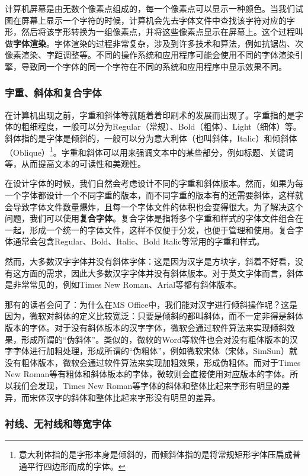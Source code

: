 计算机屏幕是由无数个像素点组成的，每一个像素点可以显示一种颜色。当我们试图在屏幕上显示一个字符的时候，计算机会先去字体文件中查找该字符对应的字形，然后将该字形转换为一组像素点，并将这些像素点显示在屏幕上。这个过程叫做\textbf{字体渲染}。字体渲染的过程非常复杂，涉及到许多技术和算法，例如抗锯齿、次像素渲染、字距调整等。不同的操作系统和应用程序可能会使用不同的字体渲染引擎，导致同一个字体的同一个字符在不同的系统和应用程序中显示效果不同。

\subsubsection{字重、斜体和复合字体}

在计算机出现之前，字重和斜体等就随着着印刷术的发展而出现了。字重指的是字体的粗细程度，一般可以分为Regular（常规）、Bold（粗体）、Light（细体）等。斜体指的是字体是倾斜的，一般可以分为意大利体（也叫斜体，Italic）和倾斜体（Oblique）\footnote{意大利体指的是字形本身是倾斜的，而倾斜体指的是将常规矩形字体压扁成普通平行四边形而成的字体。}。字重和斜体可以用来强调文本中的某些部分，例如标题、关键词等，从而提高文本的可读性和美观性。

在设计字体的时候，我们自然会考虑设计不同的字重和斜体版本。然而，如果为每一个字体都设计一个不同字重的版本，而不同字重的版本有的还需要斜体，这样就会导致字体文件数量爆炸，且每一个字体文件的体积也会变得很大。为了解决这个问题，我们可以使用\textbf{复合字体}。复合字体是指将多个字重和样式的字体文件组合在一起，形成一个统一的字体文件，这样不仅便于分发，也便于管理和使用。复合字体通常会包含Regular、Bold、Italic、Bold Italic等常用的字重和样式。

然而，大多数汉字字体并没有斜体字体：这是因为汉字是方块字，斜着不好看，没有这方面的需求，因此大多数汉字字体并没有斜体版本。对于英文字体而言，斜体是非常常见的，例如Times New Roman、Arial等都有斜体版本。

那有的读者会问了：为什么在MS Office中，我们能对汉字进行倾斜操作呢？这是因为，微软对斜体的定义比较宽泛：只要是倾斜的都叫斜体，而不一定非得是斜体版本的字体。对于没有斜体版本的汉字字体，微软会通过软件算法来实现倾斜效果，形成所谓的“伪斜体”。类似的，微软的Word等软件也会对没有粗体版本的汉字字体进行加粗处理，形成所谓的“伪粗体”，例如微软宋体（宋体，SimSun）就没有粗体版本，微软会通过软件算法来实现加粗效果，形成伪粗体。而对于Times New Roman等有粗体和斜体版本的字体，微软则会直接使用对应版本的字体。所以我们会发现，Times New Roman等字体的斜体和整体比起来字形有明显的差异，而宋体汉字的斜体和整体比起来字形没有明显的差异。

\subsubsection{衬线、无衬线和等宽字体}

